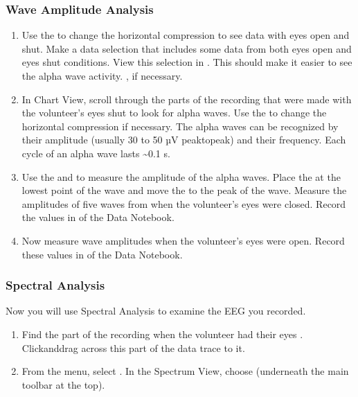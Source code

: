 \documentclass[letterpaper,10pt,english]{jupyterBook}
\begin{document}
\subsubsection{Wave Amplitude Analysis}
\label{\detokenize{EEG:wave-amplitude-analysis}}\begin{enumerate}
%
\item {} 
\sphinxAtStartPar
Use the  to change the horizontal compression to see data with eyes open and shut. Make a data selection that includes some data from both eyes open and eyes shut conditions. View this selection in . This should make it easier to see the alpha wave activity. , if necessary.

\item {} 
\sphinxAtStartPar
In Chart View, scroll through the parts of the recording that were made with the volunteer’s eyes shut to look for alpha waves. Use the  to change the horizontal compression if necessary. The alpha waves can be recognized by their amplitude (usually 30 to 50 µV peak\sphinxhyphen{}to\sphinxhyphen{}peak) and their frequency. Each cycle of an alpha wave lasts \textasciitilde{}0.1 s.

\item {} 
\sphinxAtStartPar
Use the  and  to measure the amplitude of the alpha waves. Place the  at the lowest point of the wave and move the  to the peak of the wave. Measure the amplitudes of five waves from when the volunteer’s eyes were closed. Record the values in  of the Data Notebook.

\item {} 
\sphinxAtStartPar
Now measure wave amplitudes when the volunteer’s eyes were open. Record these values in  of the Data Notebook.

\end{enumerate}


\subsubsection{Spectral Analysis}
\label{\detokenize{EEG:spectral-analysis}}
\sphinxAtStartPar
Now you will use Spectral Analysis to examine the EEG you recorded.
\begin{enumerate}
%
\item {} 
\sphinxAtStartPar
Find the part of the recording when the volunteer had their eyes . Click\sphinxhyphen{}and\sphinxhyphen{}drag across this part of the data trace to  it.

\item {} 
\sphinxAtStartPar
From the  menu, select . In the Spectrum View, choose  (underneath the main toolbar at the top).

\end{enumerate}
\end{document}
